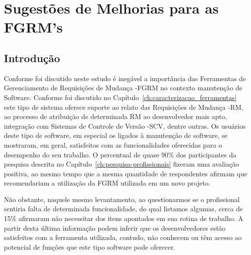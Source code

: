 \chapter{Sugestões de Melhorias para as FGRM's}
\label{ch:sug_melhoria}

\section{Introdução}
\label{sec:sug_melhoria_intro}

Conforme foi discutido neste estudo é inegável a importância das Ferramentas de
Gerenciamento de Requisições de Mudança \@-\@ FGRM no contexto manutenção de
Software. Conforme foi discutido no
Capítulo~\ref{ch:caracterizacao_ferramentas} este tipo de sistema oferece
suporte ao relato das Requisições de Mudança \@-\@ RM, ao processo de
atribuição de determinada RM ao desenvolvedor mais apto, integração com
Sistemas de Controle de Versão \@-\@ SCV, dentre outras. Os usuários deste tipo
de software, em especial os ligados à manutenção de software, se mostraram, em
geral, satisfeitos com as funcionalidades oferecidas para o desempenho do seu
trabalho. O percentual de quase 90\% dos participantes da pesquisa descrita no
Capítulo~\ref{ch:pesquisa-profissionais} fizeram uma avaliação positiva, ao
mesmo tempo que a mesma quantidade de respondentes afirmam que recomendariam a
utilização da FGRM utilizada em um novo projeto.

Não obstante, naquele mesmo levantamento, ao questionarmos se o profissional
sentiria falta de determinada funcionalidade, do qual listamos algumas, cerca de
15\% afirmaram não necessitar dos itens apontados em sua rotina de trabalho. A
partir desta última informação podem inferir que os desenvolvedores estão
satisfeitos com a ferramenta utilizada, contudo, não conhecem ou têm acesso ao
potencial de funções que este tipo software pode oferecer.

